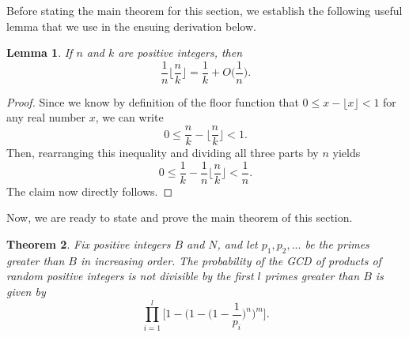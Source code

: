 \documentclass[12pt]{amsart}
\newtheorem{theorem}{Theorem}[subsection]
\newtheorem{lemma}[theorem]{Lemma}
\theoremstyle{definition}
\begin{document}
Before stating the main theorem for this section, we establish the following useful lemma that we use in the ensuing derivation below.

\begin{lemma} If $n$ and $k$ are positive integers, then
	$$\frac{1}{n} \Big\lfloor \frac{n}{k} \Big\rfloor = \frac{1}{k} + O\Big(\frac{1}{n}\Big).$$
\end{lemma}

\begin{proof}
	Since we know by definition of the floor function that $0 \leq x - \lfloor x \rfloor < 1$ for any real number $x$, we can write
	$$0 \leq \frac{n}{k} - \Big\lfloor \frac{n}{k} \Big\rfloor < 1.$$
	Then, rearranging this inequality and dividing all three parts by $n$ yields
	$$0 \leq \frac{1}{k} - \frac{1}{n}\Big\lfloor \frac{n}{k}\Big\rfloor < \frac{1}{n}.$$
	The claim now directly follows.
\end{proof}

Now, we are ready to state and prove the main theorem of this section.

\begin{theorem}
	Fix positive integers $B$ and $N$, and let $p_1, p_2, ...$ be the primes greater than $B$ in increasing order. The probability of the GCD of products of random positive integers is not divisible by the first $l$ primes greater than $B$ is given by \label{probability-random-first-l}
	$$\prod_{i=1}^{l} \Big[1 - \Big(1 - \Big(1-\frac{1}{p_i}\Big)^n\Big)^m\Big].$$
\end{theorem}
\end{document}
